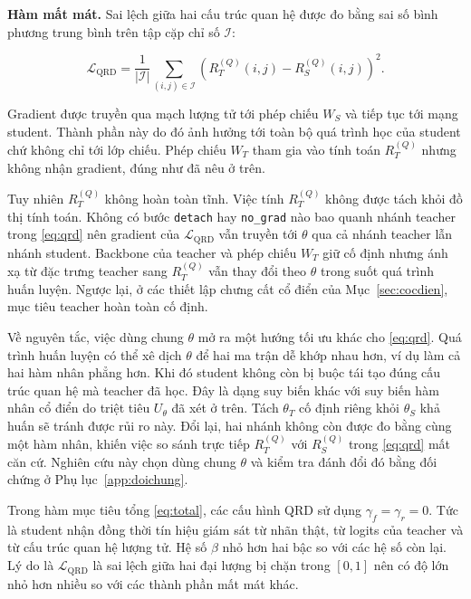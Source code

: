 \textbf{Hàm mất mát.} Sai lệch giữa hai cấu trúc quan hệ được đo bằng sai số
bình phương trung bình trên tập cặp chỉ số $\mathcal{I}$:

\begin{equation}
\label{eq:qrd}
\mathcal{L}_{\mathrm{QRD}} = \frac{1}{|\mathcal{I}|}
  \sum_{(i,j) \in \mathcal{I}}
  \left( R_T^{(Q)}(i,j) - R_S^{(Q)}(i,j) \right)^{2}.
\end{equation}

Gradient được truyền qua mạch lượng tử tới phép chiếu $W_S$ và tiếp tục tới mạng student. Thành phần này do đó ảnh hưởng tới toàn bộ quá trình học của student chứ không chỉ tới lớp chiếu. Phép chiếu $W_T$ tham gia vào tính toán
$R_T^{(Q)}$ nhưng không nhận gradient, đúng như đã nêu ở trên.

Tuy nhiên $R_T^{(Q)}$ không hoàn toàn tĩnh. Việc tính $R_T^{(Q)}$ không được
tách khỏi đồ thị tính toán. Không có bước \texttt{detach} hay
\texttt{no\_grad} nào bao quanh nhánh teacher trong \eqref{eq:qrd} nên
gradient của $\mathcal{L}_{\mathrm{QRD}}$ vẫn truyền tới $\theta$ qua cả
nhánh teacher lẫn nhánh student. Backbone của teacher và phép chiếu $W_T$
giữ cố định nhưng ánh xạ từ đặc trưng teacher sang $R_T^{(Q)}$ vẫn thay đổi theo $\theta$ trong suốt quá trình huấn luyện. Ngược lại, ở các thiết lập chưng cất cổ điển của Mục~\ref{sec:cocdien}, mục tiêu teacher hoàn toàn cố định.

Về nguyên tắc, việc dùng chung $\theta$ mở ra một hướng tối ưu khác cho
\eqref{eq:qrd}. Quá trình huấn luyện có thể xê dịch $\theta$ để hai ma trận dễ khớp nhau hơn, ví dụ làm cả hai hàm nhân phẳng hơn. Khi đó student không còn bị buộc tái tạo đúng cấu trúc quan hệ mà teacher đã học. Đây là dạng suy
biến khác với suy biến hàm nhân cổ điển do triệt tiêu $U_\theta$ đã xét
ở trên. Tách $\theta_T$ cố định riêng khỏi $\theta_S$ khả huấn sẽ tránh được rủi ro này. Đổi lại, hai nhánh không còn được đo bằng cùng một hàm nhân, khiến việc so sánh trực tiếp $R_T^{(Q)}$ với $R_S^{(Q)}$ trong
\eqref{eq:qrd} mất căn cứ. Nghiên cứu này chọn dùng chung $\theta$ và
kiểm tra đánh đổi đó bằng đối chứng ở Phụ lục~\ref{app:doichung}.

Trong hàm mục tiêu tổng \eqref{eq:total}, các cấu hình QRD sử dụng
$\gamma_f = \gamma_r = 0$. Tức là student nhận đồng thời tín hiệu giám sát
từ nhãn thật, từ logits của teacher và từ cấu trúc quan hệ lượng tử. Hệ số $\beta$ nhỏ hơn hai bậc so với các hệ số còn lại. Lý do là $\mathcal{L}_{\mathrm{QRD}}$ là sai lệch giữa hai đại lượng bị chặn trong $[0,1]$ nên có độ lớn nhỏ hơn
nhiều so với các thành phần mất mát khác.


